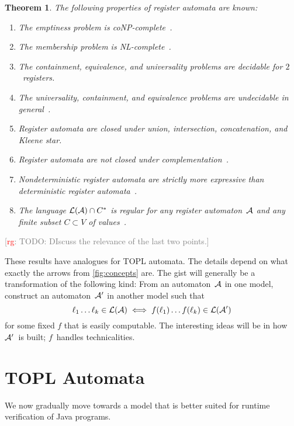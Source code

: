 \documentclass[9pt, preprint]{sigplanconf} %
\newcommand{\noterg}[2]{\textcolor{gray}{[\textcolor{red}{#1}: #2]}}
\newcommand{\rg}[1]{\noterg{rg}{#1}}
\newtheorem{theorem}{Theorem}
\theoremstyle{definition}
\theoremstyle{remark}
\begin{document}
\begin{theorem}\label{th:ra}
The following properties of register automata are known:
\begin{enumerate}
\item The emptiness problem is coNP-complete~\cite{dblp:journals/tcs/sakamotoi00}.
\item The membership problem is NL-complete~\cite{dblp:conf/mfcs/nevensv01}.
\item The containment, equivalence, and universality problems are decidable for $2$~registers.~\cite{dblp:conf/focs/kaminskif90}
\item The universality, containment, and equivalence problems are undecidable in general~\cite{dblp:conf/mfcs/nevensv01}.
\item Register automata are closed under union, intersection, concatenation, and Kleene star.~\cite{dblp:conf/focs/kaminskif90}
\item Register automata are \emph{not} closed under complementation~\cite{dblp:conf/focs/kaminskif90}.
\item Nondeterministic register automata are strictly more expressive than deterministic register automata~\cite{dblp:conf/focs/kaminskif90}.
\item The language ${\cal L}({\cal A})\cap C^*$ is regular for any register automaton~${\cal A}$ and any finite subset $C\subset V$ of values~\cite{dblp:conf/focs/kaminskif90}.
\end{enumerate}
\end{theorem}

\rg{TODO: DIscuss the relevance of the last two points.}

These results have analogues for TOPL automata.
The details depend on what exactly the arrows from \autoref{fig:concepts} are.
The gist will generally be a transformation of the following kind:
From an automaton~${\cal A}$ in one model, construct an automaton~${\cal A}'$ in another model such that
\[ \ell_1\ldots \ell_k \in {\cal L}({\cal A})
  \iff
f(\ell_1)\ldots f(\ell_k)\in{\cal L}({\cal A}') \]
for some fixed $f$ that is easily computable.
The interesting ideas will be in how ${\cal A}'$~is built;
$f$~handles technicalities.

\section{TOPL Automata}\label{sec:topl_automata} %

We now gradually move towards a model that is better suited for runtime verification of Java programs.
\end{document}
